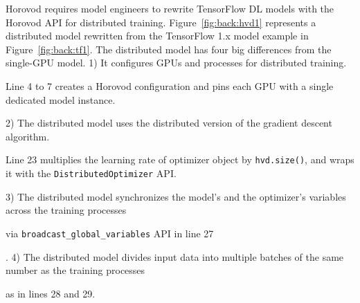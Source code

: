 Horovod requires model engineers to rewrite TensorFlow DL models with the
Horovod API for distributed training.
Figure~\ref{fig:back:hvd1} represents a distributed model rewritten from the
TensorFlow 1.x model example in Figure~\ref{fig:back:tf1}.
The distributed model has four big differences from the single-GPU model.
1) It configures GPUs and processes for distributed training.
\begin{inred}
Line 4 to 7 creates a Horovod configuration and pins each GPU with
a single dedicated model instance.
\end{inred}
2) The distributed model uses the distributed version of the gradient
descent algorithm.
\begin{inred}
Line 23 multiplies the learning rate of optimizer object by {\tt hvd.size()},
and wraps it with the {\tt DistributedOptimizer} API.
\end{inred}
3) The distributed model synchronizes the model's and the optimizer's variables
across the training processes \begin{inred}via {\tt broadcast\_global\_variables} API 
in line 27\end{inred}.
4) The distributed model divides input data into multiple batches of the same
number as the training processes \begin{inred}as in lines 28 and 29.\end{inred}


